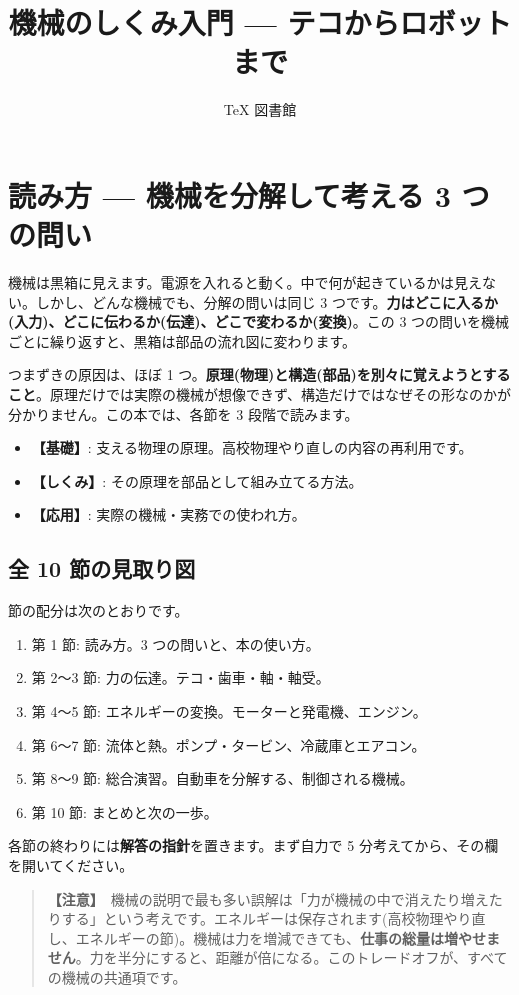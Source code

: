 \documentclass{article}
\title{機械のしくみ入門 — テコからロボットまで}
\author{TeX 図書館}
\begin{document}
\section{読み方 — 機械を分解して考える 3 つの問い}

機械は黒箱に見えます。電源を入れると動く。中で何が起きているかは見えない。しかし、どんな機械でも、分解の問いは同じ 3 つです。\textbf{力はどこに入るか(入力)、どこに伝わるか(伝達)、どこで変わるか(変換)}。この 3 つの問いを機械ごとに繰り返すと、黒箱は部品の流れ図に変わります。

つまずきの原因は、ほぼ 1 つ。\textbf{原理(物理)と構造(部品)を別々に覚えようとすること}。原理だけでは実際の機械が想像できず、構造だけではなぜその形なのかが分かりません。この本では、各節を 3 段階で読みます。

\begin{itemize}
\item \textbf{【基礎】}: 支える物理の原理。高校物理やり直しの内容の再利用です。
\item \textbf{【しくみ】}: その原理を部品として組み立てる方法。
\item \textbf{【応用】}: 実際の機械・実務での使われ方。
\end{itemize}

\subsection{全 10 節の見取り図}

節の配分は次のとおりです。

\begin{enumerate}
\item 第 1 節: 読み方。3 つの問いと、本の使い方。
\item 第 2〜3 節: 力の伝達。テコ・歯車・軸・軸受。
\item 第 4〜5 節: エネルギーの変換。モーターと発電機、エンジン。
\item 第 6〜7 節: 流体と熱。ポンプ・タービン、冷蔵庫とエアコン。
\item 第 8〜9 節: 総合演習。自動車を分解する、制御される機械。
\item 第 10 節: まとめと次の一歩。
\end{enumerate}

各節の終わりには\textbf{解答の指針}を置きます。まず自力で 5 分考えてから、その欄を開いてください。

\begin{quote}
\textbf{【注意】}\ 機械の説明で最も多い誤解は「力が機械の中で消えたり増えたりする」という考えです。エネルギーは保存されます(高校物理やり直し、エネルギーの節)。機械は力を増減できても、\textbf{仕事の総量は増やせません}。力を半分にすると、距離が倍になる。このトレードオフが、すべての機械の共通項です。
\end{quote}
\end{document}
